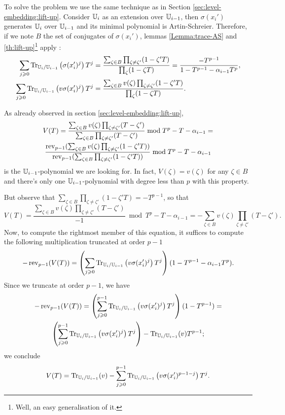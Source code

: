 To solve the problem we use the same technique as in Section
\ref{sec:level-embedding:lift-up}. Consider $\mathbb{U}_i$ as an extension
over $\mathbb{U}_{i-1}$, then $\sigma(x_i')$ generates $\mathbb{U}_i$ over $\mathbb{U}_{i-1}$
and its minimal polynomial is Artin-Schreier. Therefore, if we note
$B$ the set of conjugates of $\sigma(x_i')$, lemmas
\ref{Lemma:trace-AS} and \ref{th:lift-up}\footnote{Well, an easy
  generalisation of it.} apply :
\begin{align*}
  \sum_{j\geqslant0}\operatorname{Tr}_{\mathbb{U}_i/\mathbb{U}_{i-1}}\left(\sigma(x_i')^j\right)T^j &=
  \frac{\sum_{\zeta\in B}\prod_{\zeta\ne\zeta'}(1-\zeta'T)}
       {\prod_{\zeta}(1-\zeta T)} =
  \frac{-T^{p-1}}{1-T^{p-1}-\alpha_{i-1}T^{p}}
  \text{,}\\
  \sum_{j\geqslant0}\operatorname{Tr}_{\mathbb{U}_i/\mathbb{U}_{i-1}}\left(v\sigma(x_i')^j\right)T^j &=
  \frac{\sum_{\zeta\in B}v(\zeta)\prod_{\zeta\ne\zeta'}(1-\zeta'T)}
       {\prod_{\zeta}(1-\zeta T)}
       \text{.}
\end{align*}

As already observed in section \ref{sec:level-embedding:lift-up}, 
\begin{multline*}
  V(T) =
  \frac{\sum_{\zeta\in B}v(\zeta)\prod_{\zeta\ne\zeta'}(T-\zeta')}
       {\sum_{\zeta\in B}\prod_{\zeta\ne\zeta'}(T-\zeta')} 
       \bmod T^p-T-\alpha_{i-1} = \\
  \frac{\operatorname{rev}_{p-1}(\sum_{\zeta\in B}v(\zeta)\prod_{\zeta\ne\zeta'}(1-\zeta'T))}
       {\operatorname{rev}_{p-1}(\sum_{\zeta\in B}\prod_{\zeta\ne\zeta'}(1-\zeta'T))}
       \bmod T^p-T-\alpha_{i-1}
\end{multline*}
is the $\mathbb{U}_{i-1}$-polynomial we are looking for. In fact,
$V(\zeta)=v(\zeta)$ for any $\zeta\in B$ and there's only one
$\mathbb{U}_{i-1}$-polynomial with degree less than $p$ with this property.

But observe that $\sum_{\zeta\in B}\prod_{\zeta\ne\zeta'}(1-\zeta'T) =
-T^{p-1}$, so that
\begin{equation*}
  V(T) =
  \frac{\sum_{\zeta\in B}v(\zeta)\prod_{\zeta\ne\zeta'}(T-\zeta')}{-1} 
  \bmod T^p-T-\alpha_{i-1} =
  -\sum_{\zeta\in B}v(\zeta)\prod_{\zeta\ne\zeta'}(T-\zeta')
  \text{.}
\end{equation*}
Now, to compute the rightmost member of this equation, it suffices to
compute the following multiplication truncated at order $p-1$
\begin{equation*}
  -\operatorname{rev}_{p-1}(V(T)) =
  \left(\sum_{j\geqslant0}\operatorname{Tr}_{\mathbb{U}_i/\mathbb{U}_{i-1}}\left(v\sigma(x_i')^j\right)T^j\right)
  (1-T^{p-1}-\alpha_{i-1}T^p)
  \text{.}
\end{equation*}
Since we truncate at order $p-1$, we have
\begin{multline*}
  -\operatorname{rev}_{p-1}(V(T)) =
  \left(\sum_{j\geqslant0}^{p-1}\operatorname{Tr}_{\mathbb{U}_i/\mathbb{U}_{i-1}}\left(v\sigma(x_i')^j\right)T^j\right)
  (1-T^{p-1}) =\\
  \left(\sum_{j\geqslant0}^{p-1}\operatorname{Tr}_{\mathbb{U}_i/\mathbb{U}_{i-1}}\left(v\sigma(x_i')^j\right)T^j\right)
  - \operatorname{Tr}_{\mathbb{U}_i/\mathbb{U}_{i-1}}(v)T^{p-1}
  \text{;}
\end{multline*}
we conclude
\begin{equation*}
  V(T) =
  \operatorname{Tr}_{\mathbb{U}_i/\mathbb{U}_{i-1}}(v) -
  \sum_{j\geqslant0}^{p-1}\operatorname{Tr}_{\mathbb{U}_i/\mathbb{U}_{i-1}}\left(v\sigma(x_i')^{p-1-j}\right)T^j 
  \text{.}
\end{equation*}

